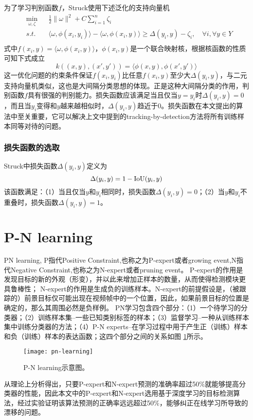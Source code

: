 为了学习判别函数$f$，Struck使用下述泛化的支持向量机
\begin{equation}
\begin{aligned}
& \min_{\omega,\zeta} &&\frac{1}{2}\|\omega\|^2 + C\sum_{i=1}^{n}\zeta_i\\
& s.t.&&\langle \omega,\phi(x_i,y_i)\rangle-\langle\omega,\phi(x_i,y)\rangle \geq \Delta(y_i,y)-\zeta_i,\quad \forall i,\forall y\in Y\\
\end{aligned}
\end{equation}
式中$f(x_i,y)=\langle\omega,\phi(x_i,y)\rangle$，$\phi(x_i,y)$是一个联合映射核，根据核函数的性质可知下式成立
\begin{equation}
k((x,y),(x',y'))=\langle\phi(x,y),\phi(x',y')\rangle
\end{equation}
这一优化问题的约束条件保证$f(x_i,y_i)$比任意$f(x_i,y)$至少大$\Delta(y_i,y)$，与二元支持向量机类似，这也是大间隔分类思想的体现。正是这种大间隔分类的作用，判别函数$f$具有很强的判别能力。损失函数应该满足当且仅当$y=y_i$时$\Delta(y_i,y)=0$，而且当$y_i$变得和$y$越来越相似时，$\Delta(y_i,y)$趋近于0。损失函数在本文提出的算法中至关重要，它可以解决上文中提到的tracking-by-detection方法将所有训练样本同等对待的问题。

\subsubsection{损失函数的选取}
Struck中损失函数$\Delta(y_i,y)$定义为
\begin{equation}
\Delta(y_i,y)=1-{\rm{IoU}}(y_i,y)
\end{equation}
该函数满足：（1）当且仅当$y$和$y_i$相同时，损失函数$\Delta(y_i,y)=0$；（2）当$y$和$y_i$不重叠时，损失函数$\Delta(y_i,y)=1$。

\section{P-N learning}
PN learning, P指代Positive Constraint,也称之为P-expert或者growing event,N指代Negative Constraint,也称之为N-expert或者pruning event。
P-expert的作用是发现目标的新的外观（形变），并以此来增加正样本的数量，从而使得检测模块更具鲁棒性；
N-expert的作用是生成负的训练样本。N-expert的前提假设是，（被跟踪的）前景目标仅可能出现在视频帧中的一个位置，因此，如果前景目标的位置是确定的，那么其周围必然是负样例。 PN学习包含四个部分：（1）一个待学习的分类器；（2）训练样本集--一些已知类别标签的样本；（3）监督学习--一种从训练样本集中训练分类器的方法；（4）P-N experts--在学习过程中用于产生正（训练）样本和负（训练）样本的表达函数；这四个部分之间的关系如图 \ref{fig:pn-learning}所示。
\begin{figure}[h]
	\centering
	\texttt{[image: pn-learning]}
	\caption{P-N learning示意图。}
	\label{fig:pn-learning}
\end{figure}
从理论上分析得出，只要P-expert和N-expert预测的准确率超过50\%就能够提高分类器的性能，因此本文中的P-expert和N-expert选用基于深度学习的目标检测算法，经过实验证明该算法预测的正确率远远超过50\%，能够纠正在线学习所导致的漂移的问题。

